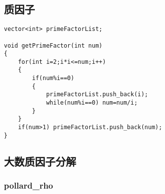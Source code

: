 \subsection{质因子}
\begin{lstlisting}
vector<int> primeFactorList;

void getPrimeFactor(int num)
{
	for(int i=2;i*i<=num;i++)
	{
		if(num%i==0)
		{
			primeFactorList.push_back(i);
			while(num%i==0) num=num/i;
		}
	}
	if(num>1) primeFactorList.push_back(num);
}
\end{lstlisting}

\subsection{大数质因子分解}
\subsubsection{pollard\_rho}
